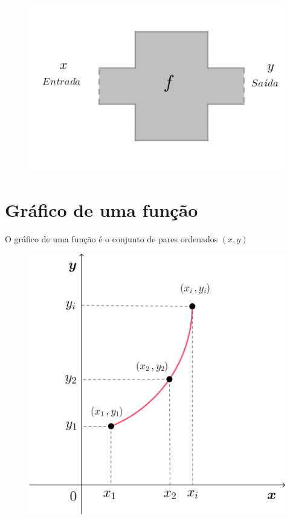 \begin{figure}[H]
	\centering
	
	\includegraphics[scale=3.5]{imagens/pensa-funcao.png}

\end{figure}

\section{Gráfico de uma função}

O gráfico de uma função é o conjunto de pares ordenados $(x,y)$ 

\begin{figure}[H]
	\centering
	
	\includegraphics[scale=3.5]{imagens/graf-funcao.png}

\end{figure}